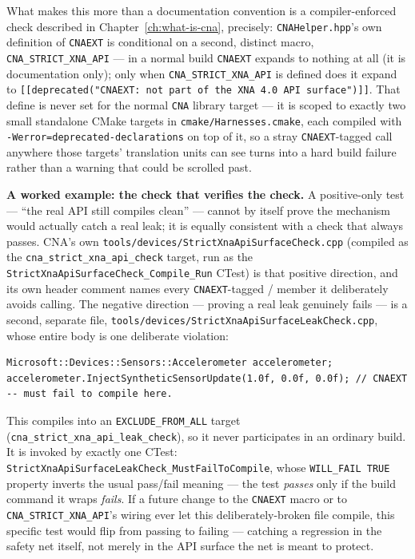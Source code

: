 What makes this more than a documentation convention is a compiler-enforced check described in
Chapter~\ref{ch:what-is-cna}, precisely: \texttt{CNAHelper.hpp}'s own definition of
\texttt{CNAEXT} is conditional on a second, distinct macro, \texttt{CNA\_STRICT\_XNA\_API} --- in
a normal build \texttt{CNAEXT} expands to nothing at all (it is documentation only); only when
\texttt{CNA\_STRICT\_XNA\_API} is defined does it expand to
\texttt{[[deprecated("CNAEXT: not part of the XNA 4.0 API surface")]]}. That define is never set
for the normal \texttt{CNA} library target --- it is scoped to exactly two small standalone
CMake targets in \texttt{cmake/Harnesses.cmake}, each compiled with
\texttt{-Werror=deprecated-declarations} on top of it, so a stray \texttt{CNAEXT}-tagged call
anywhere those targets' translation units can see turns into a hard build failure rather than a
warning that could be scrolled past.

\begin{sourcenote}
\textbf{A worked example: the check that verifies the check.} A positive-only test --- ``the
real API still compiles clean'' --- cannot by itself prove the mechanism would actually catch a
real leak; it is equally consistent with a check that always passes. CNA's own
\texttt{tools/\allowbreak{}devices/\allowbreak{}Strict\allowbreak{}Xna\allowbreak{}Api\allowbreak{}Surface\allowbreak{}Check.cpp} (compiled as the
\texttt{cna\allowbreak{}\_strict\allowbreak{}\_xna\allowbreak{}\_api\allowbreak{}\_check} target,
run as the \texttt{StrictXnaApiSurfaceCheck\allowbreak{}\_Compile\allowbreak{}\_Run} CTest) is
that positive direction, and its own header comment names every \texttt{CNAEXT}-tagged
 /  member it deliberately avoids calling. The negative
direction --- proving a real leak genuinely fails --- is a second, separate file,
\texttt{tools/\allowbreak{}devices/\allowbreak{}Strict\allowbreak{}Xna\allowbreak{}Api\allowbreak{}Surface\allowbreak{}Leak\allowbreak{}Check.cpp}, whose entire body is one deliberate
violation:
\begin{lstlisting}
Microsoft::Devices::Sensors::Accelerometer accelerometer;
accelerometer.InjectSyntheticSensorUpdate(1.0f, 0.0f, 0.0f); // CNAEXT -- must fail to compile here.
\end{lstlisting}
This compiles into an \texttt{EXCLUDE\_FROM\_ALL} target
(\texttt{cna\allowbreak{}\_strict\allowbreak{}\_xna\allowbreak{}\_api\allowbreak{}\_leak\allowbreak{}\_check}),
so it never participates in an ordinary build. It is invoked by exactly one CTest:
\texttt{Strict\allowbreak{}Xna\allowbreak{}Api\allowbreak{}Surface\allowbreak{}Leak\allowbreak{}Check\allowbreak{}\_Must\allowbreak{}Fail\allowbreak{}To\allowbreak{}Compile}, whose
\texttt{WILL\_FAIL TRUE} property inverts the usual pass/fail meaning --- the test
\emph{passes} only if the build command it wraps \emph{fails}. If a future change to the
\texttt{CNAEXT} macro or to \texttt{CNA\_STRICT\_XNA\_API}'s wiring ever let this
deliberately-broken file compile, this specific test would flip from passing to failing ---
catching a regression in the safety net itself, not merely in the API surface the net is meant
to protect.
\end{sourcenote}

